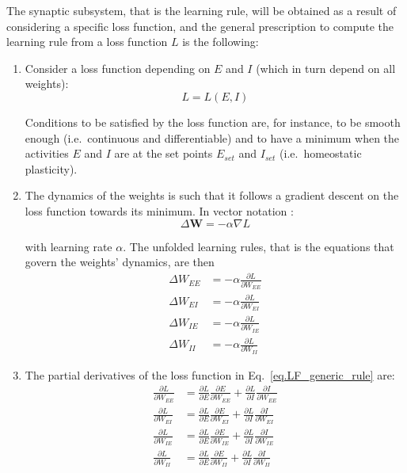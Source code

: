 \documentclass[twocolumn]{article}
\newcommand{\EE}{\mathit{EE}}
\newcommand{\EI}{\mathit{EI}}
\newcommand{\IE}{\mathit{IE}}
\newcommand{\II}{\mathit{II}}
\newcommand{\set}{\mathit{set}}
\begin{document}
The synaptic subsystem, that is the learning rule, will be obtained as a result of considering a specific loss function, and the general prescription to compute the learning rule from a loss function $L$ is the following:
\begin{enumerate}
\item Consider a loss function depending on $E$ and $I$ (which in turn depend on all weights):
\begin{displaymath}
L = L(E,I)
\end{displaymath}

\noindent Conditions to be satisfied by the loss function are, for instance, to be smooth enough (i.e.\ continuous and differentiable) and to have a minimum when the activities $E$ and $I$ are at the set points $E_{\set}$ and $I_{\set}$ (i.e.\ homeostatic plasticity).

\item The dynamics of the weights is such that it follows a gradient descent on the loss function towards its minimum. In vector notation :
\begin{equation}
\Delta \mathbf{W} = -\alpha \nabla L
\label{eq.LF_gradient}
\end{equation}

\noindent with learning rate $\alpha$. The unfolded learning rules, that is the equations that govern the weights' dynamics, are then
\begin{equation}
\begin{aligned}
\Delta W_{\EE} & = - \alpha \frac{\partial L}{\partial W_{\EE}} \\
\Delta W_{\EI} & = - \alpha \frac{\partial L}{\partial W_{\EI}} \\
\Delta W_{\IE} & = - \alpha \frac{\partial L}{\partial W_{\IE}} \\
\Delta W_{\II} & = - \alpha \frac{\partial L}{\partial W_{\II}} \end{aligned}
\label{eq.LF_generic_rule}
\end{equation}


\item The partial derivatives of the loss function in Eq.\ \ref{eq.LF_generic_rule} are:
\begin{equation}
\begin{aligned}
\frac{\partial L}{\partial W_{\EE}} & = \frac{\partial L}{\partial E} \frac{\partial E}{\partial W_{\EE}} + \frac{\partial L}{\partial I} \frac{\partial I}{\partial W_{\EE}} \\
\frac{\partial L}{\partial W_{\EI}} & = \frac{\partial L}{\partial E} \frac{\partial E}{\partial W_{\EI}} + \frac{\partial L}{\partial I} \frac{\partial I}{\partial W_{\EI}} \\
\frac{\partial L}{\partial W_{\IE}} & = \frac{\partial L}{\partial E} \frac{\partial E}{\partial W_{\IE}} + \frac{\partial L}{\partial I} \frac{\partial I}{\partial W_{\IE}} \\
\frac{\partial L}{\partial W_{\II}} & = \frac{\partial L}{\partial E} \frac{\partial E}{\partial W_{\II}} + \frac{\partial L}{\partial I} \frac{\partial I}{\partial W_{\II}} \end{aligned}
\label{eq.LF_chain_rule}
\end{equation}


\end{enumerate}
\end{document}
